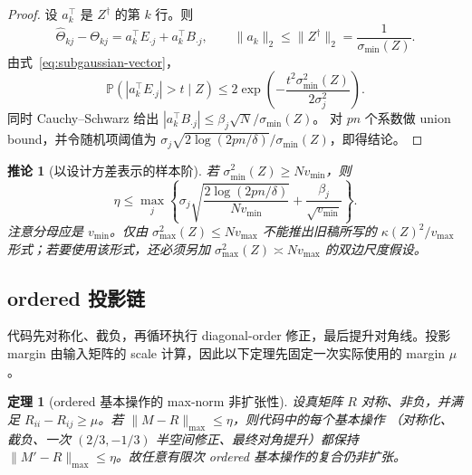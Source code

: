 \documentclass[UTF8,11pt]{ctexart}
\newtheorem{theorem}[definition]{定理}
\newtheorem{corollary}[definition]{推论}
\newcommand{\Pbb}{\mathbb P}
\begin{document}
\begin{proof}
设 $a_k^\top$ 是 $Z^\dagger$ 的第 $k$ 行。则
\begin{equation*}
 \widehat\Theta_{kj}-\Theta_{kj}
 =a_k^\top E_{\cdot j}+a_k^\top B_{\cdot j},
 \qquad
 \|a_k\|_2\le\|Z^\dagger\|_2=\frac1{\sigma_{\min}(Z)}.
\end{equation*}
由式~\eqref{eq:subgaussian-vector}，
\begin{equation*}
 \Pbb(|a_k^\top E_{\cdot j}|>t\mid Z)
 \le2\exp\left(-\frac{t^2\sigma_{\min}^2(Z)}{2\sigma_j^2}\right).
\end{equation*}
同时 Cauchy--Schwarz 给出
$|a_k^\top B_{\cdot j}|\le\beta_j\sqrt N/\sigma_{\min}(Z)$。
对 $pn$ 个系数做 union bound，并令随机项阈值为
$\sigma_j\sqrt{2\log(2pn/\delta)}/\sigma_{\min}(Z)$，即得结论。
\end{proof}

\begin{corollary}[以设计方差表示的样本阶]
\label{cor:ols-sample}
若 $\sigma_{\min}^2(Z)\ge Nv_{\min}$，则
\begin{equation}
 \eta\le
 \max_j\left\{
 \sigma_j\sqrt{\frac{2\log(2pn/\delta)}{Nv_{\min}}}
 +\frac{\beta_j}{\sqrt{v_{\min}}}
 \right\}.
 \label{eq:ols-vmin}
\end{equation}
注意分母应是 $v_{\min}$。仅由
$\sigma_{\max}^2(Z)\le Nv_{\max}$ 不能推出旧稿所写的
$\kappa(Z)^2/v_{\max}$ 形式；若要使用该形式，还必须另加
$\sigma_{\max}^2(Z)\asymp Nv_{\max}$ 的双边尺度假设。
\end{corollary}

\subsection{ordered 投影链}

代码先对称化、截负，再循环执行 diagonal-order 修正，最后提升对角线。投影 margin
由输入矩阵的 scale 计算，因此以下定理先固定一次实际使用的 margin $\mu$。

\begin{theorem}[ordered 基本操作的 max-norm 非扩张性]
\label{thm:ordered-projection}
设真矩阵 $R$ 对称、非负，并满足
$R_{ii}-R_{ij}\ge\mu$。若 $\|M-R\|_{\max}\le\eta$，则代码中的每个基本操作
（对称化、截负、一次 $(2/3,-1/3)$ 半空间修正、最终对角提升）都保持
$\|M'-R\|_{\max}\le\eta$。故任意有限次 ordered 基本操作的复合仍非扩张。
\end{theorem}
\end{document}
